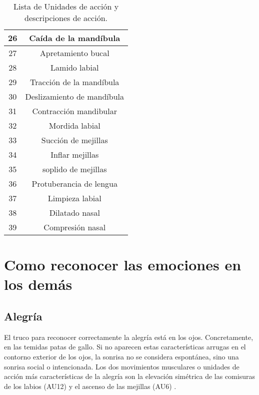 \begin{table}[H]
\begin{tabular}{|c|c|}
26            & Caída de la mandíbula               \\ \hline
27            & Apretamiento bucal                  \\ \hline
28            & Lamido labial                       \\ \hline
29            & Tracción de la mandíbula            \\ \hline
30            & Deslizamiento de mandíbula          \\ \hline
31            & Contracción mandibular              \\ \hline
32            & Mordida labial                      \\ \hline
33            & Succión de mejillas                 \\ \hline
34            & Inflar mejillas                     \\ \hline
35            & soplido de mejillas                 \\ \hline
36            & Protuberancia de lengua             \\ \hline
37            & Limpieza labial                     \\ \hline
38            & Dilatado nasal                      \\ \hline
39            & Compresión nasal                    \\ \hline
\end{tabular}
\caption{Lista de Unidades de acción y descripciones de acción.}
    \label{cuadro:AU}
\end{table}

\section*{Como reconocer las emociones en los demás}

\subsection*{Alegría}
El truco para reconocer correctamente la alegría está en los ojos. Concretamente, en las temidas patas de gallo. Si no aparecen estas características arrugas en el contorno exterior de los ojos, la sonrisa no se considera espontánea, sino una sonrisa social o intencionada. Los dos movimientos musculares o unidades de acción más características de la alegría son la elevación simétrica de las comisuras de los labios (AU12) y el ascenso de las mejillas (AU6) \cite{ReconocerLasEmociones}.


